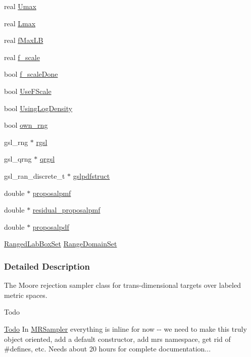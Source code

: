 \begin{DoxyCompactItemize}
real \hyperlink{classMRSampler_ac22f171e36cc11caa473d8232e9c0786}{\-Umax}
\item 
real \hyperlink{classMRSampler_a977efd8e3ab58d4e88bc647e68460071}{\-Lmax}
\item 
real \hyperlink{classMRSampler_a5980112acaced10adc29397c200fa798}{f\-Max\-L\-B}
\item 
real \hyperlink{classMRSampler_a9c85b485d8d4ed429e23af0e0427cbe8}{f\-\_\-scale}
\item 
bool \hyperlink{classMRSampler_aa677251ac24e0083e75a9ba5f4aa02ca}{f\-\_\-scale\-Done}
\item 
bool \hyperlink{classMRSampler_a64134c93ecebc9f1a53b32c07bc18858}{\-Use\-F\-Scale}
\item 
bool \hyperlink{classMRSampler_a5f1bfb7fca5ef5a992a9bc812b19bddd}{\-Using\-Log\-Density}
\item 
bool \hyperlink{classMRSampler_aa3abc2865eb1f5eed99f3b4017621d04}{own\-\_\-rng}
\item 
gsl\-\_\-rng $\ast$ \hyperlink{classMRSampler_a83ea740a453f9274eb77909ba0573a97}{rgsl}
\item 
gsl\-\_\-qrng $\ast$ \hyperlink{classMRSampler_a3045790ee467171c7ed5b1a7520457f6}{qrgsl}
\item 
gsl\-\_\-ran\-\_\-discrete\-\_\-t $\ast$ \hyperlink{classMRSampler_aeb2b7cd2e8b2459ed444a38b327897fd}{gslpdfstruct}
\item 
double $\ast$ \hyperlink{classMRSampler_a0019552cda42dbc57e0bbf88b661fbce}{proposalpmf}
\item 
double $\ast$ \hyperlink{classMRSampler_adf347c7e241dda4ccd20e8d661da5e72}{residual\-\_\-proposalpmf}
\item 
double $\ast$ \hyperlink{classMRSampler_ad32ae929145a5d9a1b042aaf4bd34952}{proposalpdf}
\item 
\hyperlink{SmallClasses_8hpp_a620bc30fe4c7a65c0a4cdbaf724bd9e9}{\-Ranged\-Lab\-Box\-Set} \hyperlink{classMRSampler_aec967af4872910cd04b49227d843ec66}{\-Range\-Domain\-Set}
\end{DoxyCompactItemize}


\subsubsection{\-Detailed \-Description}
\-The \-Moore rejection sampler class for trans-\/dimensional targets over labeled metric spaces. 

\begin{DoxyRefDesc}{\-Todo}
\item[\hyperlink{todo__todo000005}{\-Todo}]\-In \hyperlink{classMRSampler}{\-M\-R\-Sampler} everything is inline for now -\/-\/ we need to make this truly object oriented, add a default constructor, add mrs namespace, get rid of \#defines, etc. \-Needs about 20 hours for complete documentation... \end{DoxyRefDesc}


